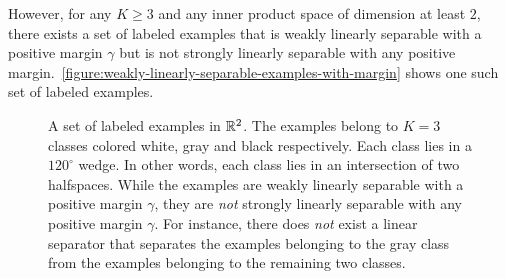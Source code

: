 However, for any $K \ge 3$ and any inner product space of dimension at least
$2$, there exists a set of labeled examples that is weakly linearly separable
with a positive margin $\gamma$ but is not strongly linearly separable with
any positive margin.~\autoref{figure:weakly-linearly-separable-examples-with-margin}
shows one such set of labeled examples.

\begin{figure}
\begin{center}
 \scalebox{.8}{}
\end{center}
\caption[]{A set of labeled examples in $\mathbb{R}^2$. The examples belong to
$K=3$ classes colored white, gray and black respectively. Each class lies in a
$120^\circ$ wedge. In other words, each class lies in an intersection of two
halfspaces. While the examples are weakly linearly separable with a positive margin
$\gamma$, they are \emph{not} strongly linearly separable with any positive
margin $\gamma$. For instance, there does \emph{not} exist a linear separator
that separates the examples belonging to the gray class from the examples
belonging to the remaining two classes.
}
\label{figure:weakly-linearly-separable-examples-with-margin}
\end{figure}
